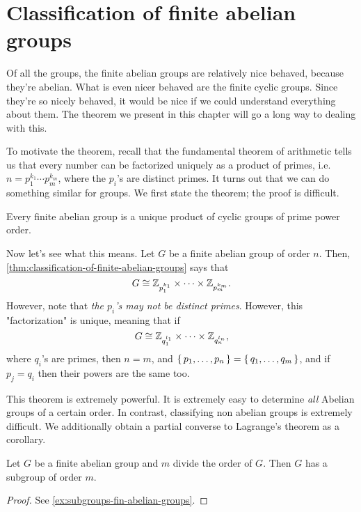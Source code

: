 \documentclass[./main.tex]{subfiles}
\begin{document}
\section{Classification of finite abelian groups}
Of all the groups, the finite abelian groups are relatively nice behaved,
because they're abelian. What is even nicer behaved are the finite cyclic
groups. Since they're so nicely behaved, it would be nice if we could understand
everything about them. The theorem we present in this chapter will go a long way
to dealing with this.

To motivate the theorem, recall that the fundamental theorem of arithmetic tells
us that every number can be factorized uniquely as a product of primes, i.e. $n
= p_1^{k_1} \cdots p_m^{k_m}$, where the $p_i$'s are distinct primes. It turns
out that we can do something similar for groups. We first state the theorem; the
proof is difficult.

\begin{theorem}
\label{thm:classification-of-finite-abelian-groups}
    Every finite abelian group is a unique product of cyclic groups of prime
    power order. 
\end{theorem}
Now let's see what this means. Let $G$ be a finite abelian group of order $n$.
Then, \cref{thm:classification-of-finite-abelian-groups} says that 
\[
    G \cong \mathbb{Z}_{p_1^{k_1}} \times \cdots \times \mathbb{Z}_{p_m^{k_m}}.
\]
However, note that \emph{the $p_i$'s may not be distinct primes}. However, this
"factorization" is unique, meaning that if 
\[
    G \cong \mathbb{Z}_{q_1^{l_1}} \times \cdots \times \mathbb{Z}_{q_n^{l_n}},
\]
where $q_i$'s are primes, then $n = m$, and $\set{p_1, \dots, p_n} = \set{q_1,
\dots, q_m}$, and if $p_j = q_i$ then their powers are the same too.


This theorem is extremely powerful. It is extremely easy to determine \emph{all}
Abelian groups of a certain order. In contrast, classifying non abelian groups
is extremely difficult. We additionally obtain a partial converse to Lagrange's
theorem as a corollary.
\begin{corollary}
\label{cor:subgroups-fin-abelian-groups}
    Let $G$ be a finite abelian group and $m$ divide the order of $G$. Then $G$
    has a subgroup of order $m$.
\end{corollary}
\begin{proof}
    See \cref{ex:subgroups-fin-abelian-groups}.
\end{proof}
\end{document}
